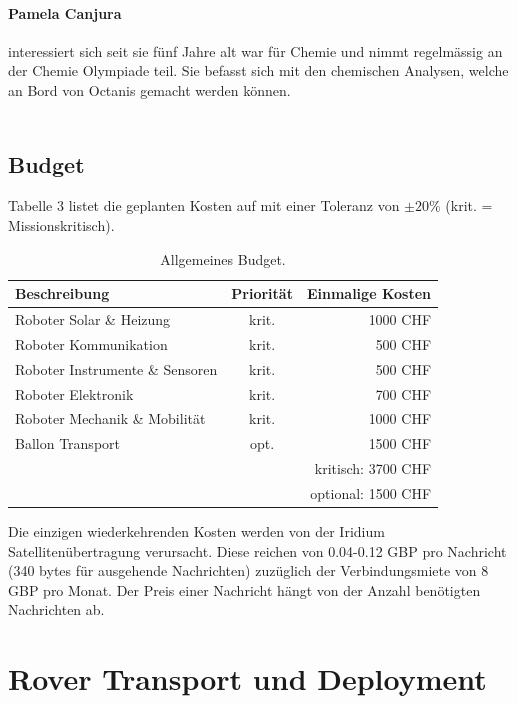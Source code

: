 \documentclass[a4paper,12pt]{article}
\begin{document}
\paragraph{Pamela Canjura} interessiert sich seit sie fünf Jahre alt war für Chemie und nimmt regelmässig an der Chemie Olympiade teil. Sie befasst sich mit den chemischen Analysen, welche an Bord von Octanis gemacht werden können.
\\ \\


\subsection{Budget}

Tabelle 3 listet die geplanten Kosten auf mit einer Toleranz von $\pm 20\%$ (krit. = Missionskritisch). \\ 

\begin{table}[h!]

\centering
\begin{tabular}{ l | c || r }
  Beschreibung & Priorität & Einmalige Kosten \\
  \hline
  Roboter Solar \& Heizung & krit. & 1000 CHF \\
  Roboter Kommunikation & krit. & 500 CHF \\
  Roboter Instrumente \& Sensoren & krit. & 500 CHF \\
  Roboter Elektronik & krit. & 700 CHF \\
  Roboter Mechanik \& Mobilität & krit. & 1000 CHF \\
  Ballon Transport & opt. & 1500 CHF \\
  \hline \hline
  & & kritisch: 3700 CHF  \\
  & & optional: 1500 CHF \\
\end{tabular}
\caption{Allgemeines Budget.}
\end{table}

Die einzigen wiederkehrenden Kosten werden von der Iridium Satellitenübertragung \cite{iridium} verursacht. Diese reichen von 0.04-0.12 GBP pro Nachricht (340 bytes für ausgehende Nachrichten) zuzüglich der Verbindungsmiete von 8 GBP pro Monat. Der Preis einer Nachricht hängt von der Anzahl benötigten Nachrichten ab.



\section{Rover Transport und Deployment}
\end{document}
